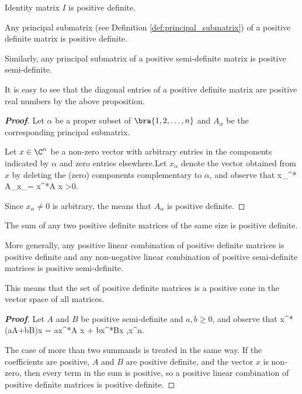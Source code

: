 \begin{example}
Identity matrix $I$ is positive definite.
\end{example}

\begin{proposition}\label{pro:positive_definite_principal_submatrix_is_positive_definite}
Any principal submatrix (see Definition \ref{def:principal_submatrix}) of a positive definite matrix is positive definite.

Similarly, any principal submatrix of a positive semi-definite matrix is positive semi-definite.
\end{proposition}

\begin{remark}
It is easy to see that the diagonal entries of a positive definite matrix are positive real numbers by the above proposition.
\end{remark}

\begin{proof}[\bf Proof]
Let $\alpha$ be a proper subset of $\bra{1,2,\dots,n}$ and $A_{\alpha}$ be the corresponding principal submatrix.

Let $x\in\C^n$ be a non-zero vector with arbitrary entries in the components indicated by $\alpha$ and zero entries elsewhere.Let $x_\alpha$ denote the vector obtained from $x$ by deleting the
(zero) components complementary to $\alpha$, and observe that
\be
x_\alpha^* A_\alpha x_\alpha = x^*A x >0.
\ee

Since $x_\alpha \neq 0$ is arbitrary, the means that $A_\alpha$ is positive definite.
\end{proof}

\begin{proposition}
The sum of any two positive definite matrices of the same size is positive definite. 

More generally, any positive linear combination of positive definite matrices is positive definite and any
non-negative linear combination of positive semi-definite matrices is positive semi-definite.
\end{proposition}

\begin{remark}
This means that the set of positive definite matrices is a positive cone in the vector space of all matrices.
\end{remark}

\begin{proof}[\bf Proof]
Let $A$ and $B$ be positive semi-definite and $a,b\geq 0$, and observe that
\be
x^*(aA+bB)x = ax^*A x + bx^*Bx ,\qquad \forall x\in \C^n.
\ee

The case of more than two summands is treated in the same way. If the coefficients are positive, $A$ and $B$ are positive definite, and the vector $x$ is non-zero, then every term in the sum is
positive, so a positive linear combination of positive definite matrices is positive definite.
\end{proof}

